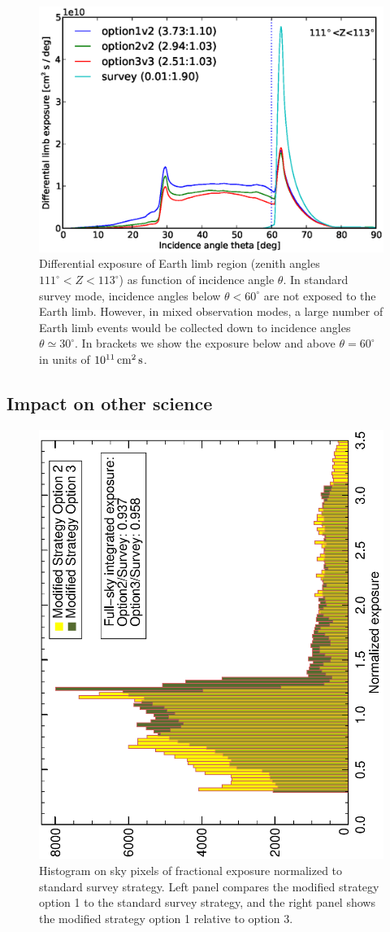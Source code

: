 \documentclass[aps,prd,superscriptaddress,showpacs,nofootinbib,fixlfloat, 12pt]{revtex4-1}
\begin{document}
\begin{figure}[t]
  \begin{center}
    \includegraphics[width=0.6\linewidth]{plots/limb_exposure.eps}
    \vspace{-0.5cm}
  \end{center}
  \caption{Differential exposure of Earth limb region (zenith angles
    $111^\circ<Z<113^\circ$) as function of incidence angle $\theta$. In
    standard survey mode, incidence angles below $\theta<60^\circ$ are not
    exposed to the Earth limb. However, in mixed observation modes, a
    large number of Earth limb events would be collected down to incidence
    angles $\theta\simeq30^\circ$. In brackets we show the exposure below and
  above $\theta=60^\circ$ in units of $10^{11}\rm\,cm^2\,s$.}
  \label{fig:limb_exposure}
\end{figure}


\subsection{Impact on other science}

\begin{figure}[t]
  \begin{center}
    \includegraphics[width=0.49\linewidth, angle=-90]{plots/option2_option3_hist.ps}
    \vspace{-0.5cm}
  \end{center}
  \caption{Histogram on sky pixels of fractional exposure normalized to
  standard survey strategy. Left panel compares the modified strategy option 1
  to the standard survey strategy, and the right panel shows the modified
  strategy option 1 relative to option 3. }
  \label{fig:expHisto}
\end{figure}
\end{document}
